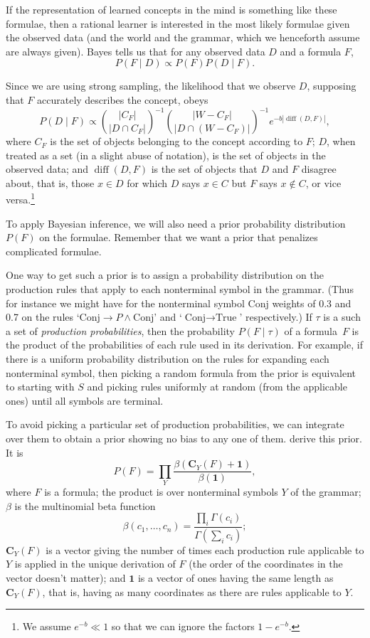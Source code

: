 \documentclass[apacite,jou]{apa6}
\newcommand{\Conj}{\text{Conj}}
\newcommand{\True}{\text{True}}
\DeclareMathOperator{\diff}{diff}
\begin{document}
If the representation of learned concepts in the mind is
something like these formulae, then a rational
learner is interested in the most
likely formulae given the observed data (and the world and the grammar,
which we henceforth assume are always given). Bayes tells us that
for any observed data $D$ and a formula $F$,
\[P(F\mid D) \propto P(F) P(D\mid F). \]

Since we are using strong sampling, the likelihood that we observe $D$,
supposing that $F$ accurately describes the concept,
obeys
\[P(D\mid F) \propto \binom{|C_F|}{|D \cap C_F|}^{-1}
	\binom{|W- C_F|}{|D \cap (W- C_F)|}^{-1}
	e^{-b |\diff(D, F)|}, \]
where $C_F$ is the set of objects belonging to the concept
according to $F$;
$D$, when treated as a set (in a slight abuse of notation),
is the set of objects in the observed data;
and $\diff(D, F)$ is the set of objects that $D$ and $F$ disagree about,
that is, those $x\in D$ for which $D$ says $x\in C$ 
but $F$ says $x\notin C$,
or vice versa.\footnote{We assume $e^{-b} \ll 1$ so that we can ignore
the factors $1-e^{-b}$.}

 To apply
Bayesian inference, we will also need a prior probability distribution
$P(F)$
on the formulae. Remember that we want a prior that penalizes
complicated formulae.

One way to get such a prior is to
assign a probability distribution on the production rules that apply
to each nonterminal symbol in the grammar.
(Thus for instance we might have for the nonterminal symbol $\text{Conj}$
weights of 0.3 and 0.7 on the rules 
	`$\Conj \to P \wedge \Conj$'
and
	`$\Conj \to \True$'
respectively.)
If $\tau$ is a such a set of \emph{production probabilities},
  then the probability $P(F\mid \tau)$ of a
formula~$F$ is the product of the probabilities of each rule used
in its derivation. For example, if there is a uniform probability
distribution on the rules for expanding each nonterminal symbol,
then picking a random formula from the prior is equivalent to
starting with $S$ and picking rules uniformly at random (from 
the applicable ones) until all symbols are terminal. 

To avoid picking a particular set of production probabilities,
we can integrate over them to obtain a prior showing no 
bias to any one of them. \citet{rrdnf} derive this prior. It is
\[P(F) = \prod_Y
	\frac{\beta(\mathbf{C}_Y(F) + \mathbf{1})}{\beta(\mathbf{1})},\]
where $F$ is a formula; the product is over nonterminal symbols $Y$
of the grammar; $\beta$ is the multinomial beta function
\[\beta(c_1,\ldots,c_n) = \frac{\prod_i\Gamma(c_i)}{\Gamma(\sum_i c_i)};\]
$\mathbf{C}_Y(F)$ is a vector  
giving the number of times each production rule
applicable to $Y$ is applied in the unique derivation of $F$ (the order
of the coordinates in the vector doesn't matter); and $\mathbf{1}$ is a
vector of ones having the same length as $\mathbf{C}_Y(F)$, that is,
having as many coordinates as there are rules applicable to $Y$.
\end{document}
